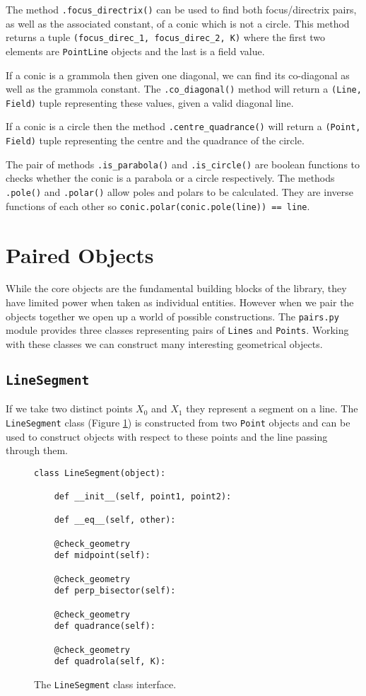 The method \texttt{.focus\_directrix()} can be used to find both focus/directrix pairs, as well as the associated constant, of a conic which is not a circle.
This method returns a tuple \texttt{(focus\_direc\_1, focus\_direc\_2, K)} where the first two elements are \texttt{PointLine} objects and the last is a field value.

If a conic is a grammola then given one diagonal, we can find its co-diagonal as well as the grammola constant.
The \texttt{.co\_diagonal()} method will return a \texttt{(Line, Field)} tuple representing these values, given a valid diagonal line.

If a conic is a circle then the method \texttt{.centre\_quadrance()} will return a \texttt{(Point, Field)} tuple representing the centre and the quadrance of the circle.

The pair of methods \texttt{.is\_parabola()} and \texttt{.is\_circle()} are boolean functions to checks whether the conic is a parabola or a circle respectively. 
The methods \texttt{.pole()} and \texttt{.polar()} allow poles and polars to be calculated. They are inverse functions of each other so \texttt{conic.polar(conic.pole(line)) == line}.


\section{Paired Objects}

While the core objects are the fundamental building blocks of the \pygeom library, they have limited power when taken as individual entities.
However when we pair the objects together we open up a world of possible constructions.
The \texttt{pairs.py} module provides three classes representing pairs of \texttt{Lines} and \texttt{Points}.
Working with these classes we can construct many interesting geometrical objects.

\subsection{\texttt{LineSegment}}

If we take two distinct points $X_0$ and $X_1$ they represent a segment on a line.
The \texttt{LineSegment} class (Figure \ref{fig:linesegment}) is constructed from two \texttt{Point} objects and can be used to construct objects with respect to these points and the line passing through them.

\begin{figure}[!hbt]
\begin{verbatim}
class LineSegment(object):

    def __init__(self, point1, point2):

    def __eq__(self, other):

    @check_geometry
    def midpoint(self):

    @check_geometry
    def perp_bisector(self):

    @check_geometry
    def quadrance(self):

    @check_geometry
    def quadrola(self, K):
\end{verbatim}
\caption{The \texttt{LineSegment} class interface.}\label{fig:linesegment}
\end{figure}

